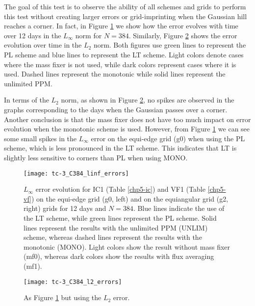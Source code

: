 The goal of this test is to observe the ability of all schemes and grids to perform this test without creating
larger errors or grid-imprinting when the Gaussian hill reaches a corner.
In fact, in Figure \ref{chp-advcs-sec-exp-adv2-evol-linf} we show how the error evolves with time over 12 days in the $L_{\infty}$ norm for $N=384$.
Similarly, Figure \ref{chp-advcs-sec-exp-adv2-evol-l2} shows the error evolution over time in the $L_2$ norm.
Both figures use green lines to represent the PL scheme and blue lines to represent the LT scheme.
Light colors denote cases where the mass fixer is not used, while dark colors represent cases where it is used. 
Dashed lines represent the monotonic while solid lines represent the unlimited PPM.

\newpage
In terms of the $L_2$ norm, as shown in Figure \ref{chp-advcs-sec-exp-adv2-evol-l2}, 
no spikes are observed in the graphs corresponding to the days when the Gaussian passes over a corner.
Another conclusion is that the mass fixer does not have too much impact on error evolution when the monotonic scheme is used.
However, from Figure \ref{chp-advcs-sec-exp-adv2-evol-linf} we can see some small spikes in the $L_{\infty}$ error
on the equi-edge grid (g0) when using the PL scheme, which is less pronounced in the LT scheme.
This indicates that LT is slightly less sensitive to corners than PL when using MONO. 
\begin{figure}[!htb]
	\centering
	\texttt{[image: tc-3\_C384\_linf\_errors]}
	\caption{
		$L_{\infty}$ error evolution for IC1 (Table \ref{chp5-ic}) and VF1 (Table \ref{chp5-vf}) 
		on the equi-edge grid (g0, left) and on the equiangular grid (g2, right) grids for 12 days and $N=384$.
		Blue lines indicate the use of the LT scheme, while green lines represent the PL scheme.
		Solid lines represent the results with the unlimited PPM (UNLIM) scheme, whereas dashed lines represent the results with the monotonic (MONO).
		Light colors show the result without mass fixer (mf0), whereas dark colors show the results with flux averaging (mf1).
		\label{chp-advcs-sec-exp-adv2-evol-linf}}
\end{figure}

\begin{figure}[!htb]
	\centering
	\texttt{[image: tc-3\_C384\_l2\_errors]}
	\caption{As Figure \ref{chp-advcs-sec-exp-adv2-evol-linf} but using the $L_2$ error.\label{chp-advcs-sec-exp-adv2-evol-l2}}
\end{figure}

